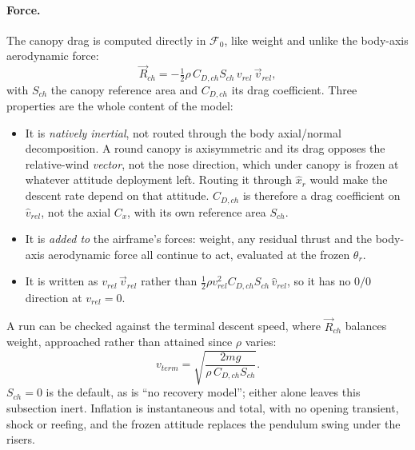 \paragraph{Force.} The canopy drag is computed directly in $\mathcal{F}_0$, like weight and unlike
the body-axis aerodynamic force:
\begin{equation} \label{eq:chute_force}
    \vec{R}_{ch} = -\tfrac12\rho\,C_{D,ch}S_{ch}\,v_{rel}\,\vec{v}_{rel},
\end{equation}
with $S_{ch}$ the canopy reference area and $C_{D,ch}$ its drag coefficient. Three properties are
the whole content of the model:
\begin{itemize}
    \item It is \emph{natively inertial}, not routed through the body axial/normal decomposition. A
    round canopy is axisymmetric and its drag opposes the relative-wind \emph{vector}, not the nose
    direction, which under canopy is frozen at whatever attitude deployment left. Routing it through
    $\hat{x}_r$ would make the descent rate depend on that attitude. $C_{D,ch}$ is therefore a drag
    coefficient on $\hat{v}_{rel}$, not the axial $C_x$, with its own reference area $S_{ch}$.
    \item It is \emph{added to} the airframe's forces: weight, any residual thrust and the body-axis
    aerodynamic force all continue to act, evaluated at the frozen $\theta_r$.
    \item It is written as $v_{rel}\,\vec{v}_{rel}$ rather than $\tfrac12\rho v_{rel}^2C_{D,ch}S_{ch}\,
    \hat{v}_{rel}$, so it has no $0/0$ direction at $v_{rel}=0$.
\end{itemize}
A run can be checked against the terminal descent speed, where $\vec{R}_{ch}$ balances weight,
approached rather than attained since $\rho$ varies:
\begin{equation} \label{eq:chute_terminal}
    v_{term} = \sqrt{\frac{2mg}{\rho\,C_{D,ch}S_{ch}}}.
\end{equation}
$S_{ch}=0$ is the default, as is ``no recovery model''; either alone leaves this subsection inert.
Inflation is instantaneous and total, with no opening transient, shock or reefing, and the frozen
attitude replaces the pendulum swing under the risers.

